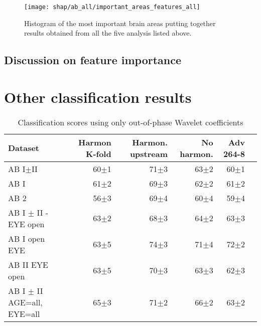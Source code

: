 \documentclass[10pt]{report}
\begin{document}
\begin{figure}[h]
\centering
  \texttt{[image: shap/ab\_all/important\_areas\_features\_all]}
\caption{Histogram of the most important brain areas putting together results obtained from all the five analysis listed above.}
\label{fig:important_areas_features_all}
\end{figure}

\section{Discussion on feature importance}


\newpage


\appendix


\chapter{Other classification results}

\begin{table}[!htp]\centering
\scriptsize
\begin{tabular}{lrrrrr}\toprule
Dataset &Harmon K-fold &Harmon. upstream &No harmon. &Adv 264-8 \\\midrule
AB I$\pm$II &60$\pm$1 &71$\pm$3 &63$\pm$2 &60$\pm$1 \\
AB I &61$\pm$2 &69$\pm$3 &62$\pm$2 &61$\pm$2 \\
AB 2 &56$\pm$3 &69$\pm$4 &60$\pm$4 &59$\pm$4 \\
AB I $\pm$ II - EYE open &63$\pm$2 &68$\pm$3 &64$\pm$2 &63$\pm$3 \\
AB I open EYE &63$\pm$5 &74$\pm$3 &71$\pm$4 &72$\pm$2 \\
AB II EYE open &63$\pm$5 &70$\pm$3 &63$\pm$3 &62$\pm$3 \\
AB I $\pm$ II AGE=all, EYE=all &65$\pm$3 &71$\pm$2 &66$\pm$2 &63$\pm$2 \\
\bottomrule
\end{tabular}
\caption{Classification scores using only out-of-phase Wavelet coefficients}
\label{tab:classification_wout}
\end{table}
\end{document}
